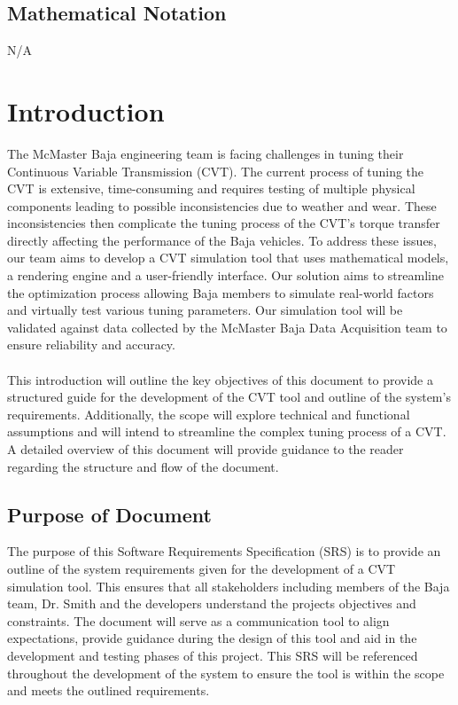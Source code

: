 \documentclass[12pt]{article}
\begin{document}
\subsection{Mathematical Notation}

N/A

\newpage


\section{Introduction}

The McMaster Baja engineering team is facing challenges in tuning their Continuous Variable Transmission (CVT). 
The current process of tuning the CVT is extensive, time-consuming and requires testing of multiple physical components leading to possible inconsistencies due to weather and wear. 
These inconsistencies then complicate the tuning process of the CVT’s torque transfer directly affecting the performance of the Baja vehicles. 
To address these issues, our team aims to develop a CVT simulation tool that uses mathematical models, a rendering engine and a user-friendly interface. 
Our solution aims to streamline the optimization process allowing Baja members to simulate real-world factors and virtually test various tuning parameters. 
Our simulation tool will be validated against data collected by the McMaster Baja Data Acquisition team to ensure reliability and accuracy.  
\\
\\
This introduction will outline the key objectives of this document to provide a structured guide for the development of the CVT tool and outline of the system’s requirements. 
Additionally, the scope will explore technical and functional assumptions and will intend to streamline the complex tuning process of a CVT. 
A detailed overview of this document will provide guidance to the reader regarding the structure and flow of the document. 

\subsection{Purpose of Document}

The purpose of this Software Requirements Specification (SRS) is to provide an outline of the system requirements given for the development of a CVT simulation tool. 
This ensures that all stakeholders including members of the Baja team, Dr. Smith and the developers understand the projects objectives and constraints. 
The document will serve as a communication tool to align expectations, provide guidance during the design of this tool and aid in the development and testing phases of this project. 
This SRS will be referenced throughout the development of the system to ensure the tool is within the scope and meets the outlined requirements. 
\end{document}
